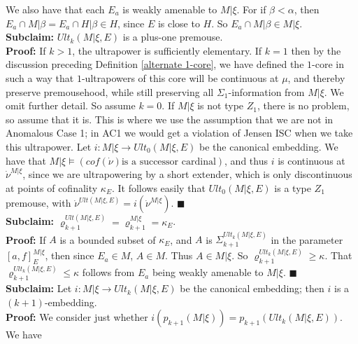 \documentclass[12pt]{article}
\begin{document}
We also have that each $E_a$ is weakly amenable to $M | \xi$.  For if $\beta < \alpha$, then $E_a \cap M| \beta = E_a \cap H | \beta \in H$, since $E$ is close to $H$.  So $E_a \cap M | \beta \in M | \xi$.\\

\textbf{Subclaim:} $Ult_k (M | \xi , E )$ is a plus-one premouse.\\

\indent \indent \textbf{Proof:} If $k > 1$, the ultrapower is sufficiently elementary.  If $k = 1$ then by the discussion preceding Definition \ref{alternate 1-core}, we have defined the $1$-core in such a way that $1$-ultrapowers of this core will be continuous at $\mu$, and thereby preserve premousehood, while still preserving all $\Sigma_1$-information from $M| \xi$.  We omit further detail.  So assume $k = 0$.  If $M | \xi$ is not type $Z_1$, there is no problem, so assume that it is.  This is where we use the assumption that we are not in Anomalous Case 1; in AC1 we would get a violation of Jensen ISC when we take this ultrapower.  Let $i: M | \xi \longrightarrow Ult_0 (M | \xi, E)$ be the canonical embedding.  We have that $M | \xi \models (cof(\dot{\nu}) \text{is a successor cardinal})$, and thus $i$ is continuous at $\dot{\nu}^{M | \xi}$, since we are ultrapowering by a short extender, which is only discontinuous at points of cofinality $\kappa_E$.  It follows easily that $Ult_0 (M | \xi , E )$ is a type $Z_1$ premouse, with $\dot{\nu}^{Ult (M | \xi , E )} = i (\dot{\nu}^{M | \xi})$. $\blacksquare$\\

\textbf{Subclaim:} $\varrho_{k+1}^{Ult (M | \xi , E)} = \varrho_{k+1}^{M | \xi} = \kappa_E$.\\

\indent \indent \textbf{Proof:} If $A$ is a bounded subset of $\kappa_E$, and $A$ is $\Sigma_{k+1}^{Ult_k (M | \xi , E )}$ in the parameter $[ a, f ]_E^{M | \xi}$, then since $E_a \in M$, $A \in M$.  Thus $A \in M | \xi$.  So $\varrho_{k+1}^{Ult_k (M | \xi , E)} \geq \kappa$.  That $\varrho_{k+1}^{Ult_k (M | \xi , E)} \leq \kappa$ follows from $E_a$ being weakly amenable to $M | \xi$. $\blacksquare$\\

\textbf{Subclaim:} Let $i: M | \xi \longrightarrow Ult_k (M | \xi , E )$ be the canonical embedding; then $i$ is a $(k+1)$-embedding.\\

\indent \indent \textbf{Proof:} We consider just whether $i ( p_{k+1} (M | \xi )) = p_{k+1} (Ult_k ( M | \xi , E ))$.  We have\\
\end{document}
